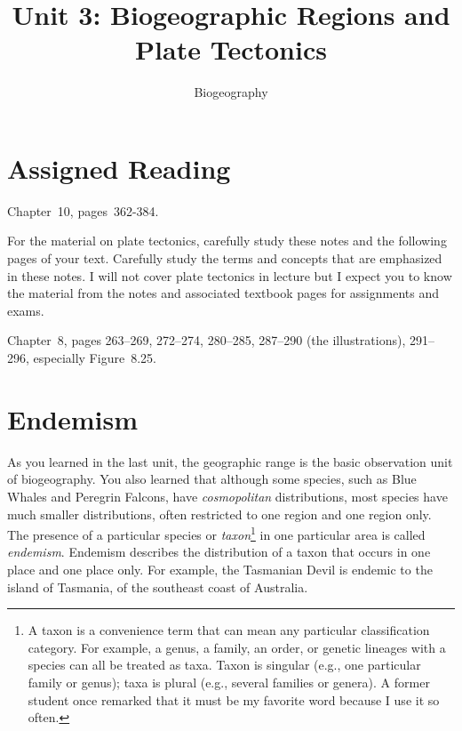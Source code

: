 \documentclass[11pt, hidelinks]{article}
\title{Unit 3: Biogeographic Regions and Plate Tectonics}
\author{Biogeography}
\date{}
\begin{document}
\maketitle
\section{Assigned Reading}

Chapter~10, pages~362-384.

For the material on plate tectonics, carefully study these notes and the following pages of your text. Carefully study the terms and concepts that are emphasized in these notes. I will not cover plate tectonics in lecture but I expect you to know the material from the notes and associated textbook pages for assignments and exams.

Chapter~8, pages 263--269, 272--274, 280--285, 287--290 (the illustrations), 291--296, especially Figure~8.25.

\section{Endemism}
As you learned in the last unit, the geographic range is the basic observation unit of biogeography.  You also learned that although some species, such as Blue Whales and Peregrin Falcons, have \emph{cosmopolitan} distributions, most species have much smaller distributions, often restricted to one region and one region only.  The presence of a particular species or \emph{taxon}\footnote{A taxon is a convenience term that can mean any particular classification category.  For example, a genus, a family, an order, or genetic lineages with a species can all be treated as taxa.  Taxon is singular (e.g., one particular family or genus); taxa is plural (e.g., several families or genera). A former student once remarked that it must be my favorite word because I use it so often.} in one particular area is called \emph{endemism}. Endemism describes the distribution of a taxon that occurs in one place and one place only. For example, the Tasmanian Devil is endemic to the island of Tasmania, of the southeast coast of Australia.
\end{document}
